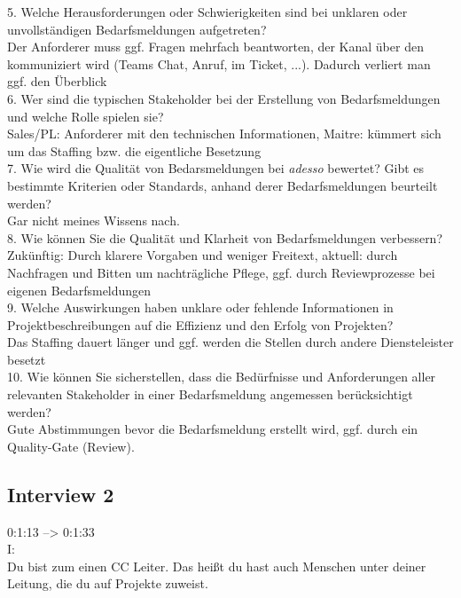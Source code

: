 5. Welche Herausforderungen oder Schwierigkeiten sind bei unklaren oder unvollständigen Bedarfsmeldungen aufgetreten?\\

Der Anforderer muss ggf. Fragen mehrfach beantworten, der Kanal über den kommuniziert wird (Teams Chat, Anruf, im Ticket, ...). Dadurch verliert man ggf. den Überblick\\

6. Wer sind die typischen Stakeholder bei der Erstellung von Bedarfsmeldungen und welche Rolle spielen sie?\\

Sales/PL: Anforderer mit den technischen Informationen, Maitre: kümmert sich um das Staffing bzw. die eigentliche Besetzung\\

7. Wie wird die Qualität von Bedarsmeldungen bei \emph{adesso} bewertet? Gibt es bestimmte Kriterien oder Standards, anhand derer Bedarfsmeldungen beurteilt werden?\\

Gar nicht meines Wissens nach.\\

8. Wie können Sie die Qualität und Klarheit von Bedarfsmeldungen verbessern?\\

Zukünftig: Durch klarere Vorgaben und weniger Freitext, aktuell: durch Nachfragen und Bitten um nachträgliche Pflege, ggf. durch Reviewprozesse bei eigenen Bedarfsmeldungen \\

9. Welche Auswirkungen haben unklare oder fehlende Informationen in Projektbeschreibungen auf die Effizienz und den Erfolg von Projekten?\\

Das Staffing dauert länger und ggf. werden die Stellen durch andere Diensteleister besetzt\\

10. Wie können Sie sicherstellen, dass die Bedürfnisse und Anforderungen aller relevanten Stakeholder in einer Bedarfsmeldung angemessen berücksichtigt werden?\\

Gute Abstimmungen bevor die Bedarfsmeldung erstellt wird, ggf. durch ein Quality-Gate (Review).\\
\subsection{Interview 2}
\label{interview2}
0:1:13 --> 0:1:33\\
I:\\
Du bist zum einen CC Leiter. Das heißt du hast auch Menschen unter deiner Leitung, die du auf Projekte zuweist.\\

